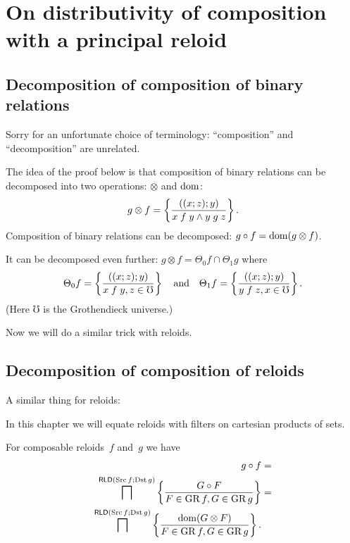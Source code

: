 
\chapter{On distributivity of composition with a principal reloid}


\section{Decomposition of composition
of binary relations}
\begin{rem}
Sorry for an unfortunate choice of terminology: ``composition''
and ``decomposition'' are unrelated.
\end{rem}
The idea of the proof below is that composition of binary relations
can be decomposed into two operations: $\otimes$ and $\operatorname{dom}$:
\[
g\otimes f=\left\{ \frac{((x;z);y)}{x\mathrel fy\land y\mathrel gz}\right\}.
\]
Composition of binary relations can be decomposed: $g\circ f=\operatorname{dom}(g\otimes f)$.

It can be decomposed even further: $g\otimes f=\Theta_{0}f\cap\Theta_{1}g$
where
\[
\Theta_{0}f=\left\{ \frac{((x;z);y)}{x\mathrel fy,z\in\mho}\right\}\quad\text{and}\quad\Theta_{1}f=\left\{ \frac{((x;z);y)}{y\mathrel fz,x\in\mho}\right\}.
\]
(Here $\mho$ is the Grothendieck universe.)

Now we will do a similar trick with reloids.


\section{Decomposition of
composition of reloids}

A similar thing for reloids:

In this chapter we will equate reloids with filters on cartesian products
of sets.

For composable reloids~$f$ and~$g$ we have
\begin{align*}
g\circ f & =\\
\bigsqcap^{\mathsf{RLD}(\operatorname{Src} f;\operatorname{Dst} g)}\left\{ \frac{G\circ F}{F\in\operatorname{GR} f,G\in\operatorname{GR} g}\right\} & =\\
\bigsqcap^{\mathsf{RLD}(\operatorname{Src} f;\operatorname{Dst} g)}\left\{ \frac{\operatorname{dom}(G\otimes F)}{F\in\operatorname{GR} f,G\in\operatorname{GR} g}\right\}.
\end{align*}

